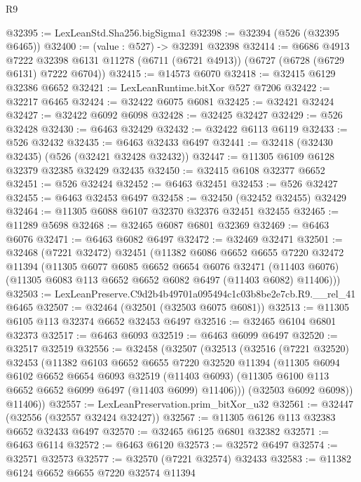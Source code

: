 \begin{lexlean}{R9}
\begin{coremodule}
@32395 := LexLeanStd.Sha256.bigSigma1
@32398 := @32394 (@526 (@32395 @6465))
@32400 := (value : @527) -> @32391 @32398
@32414 := @6686
    @4913
    @7222
    @32398
    @6131
    @11278
    (@6711 (@6721 @4913))
    (@6727 (@6728 (@6729 @6131) @7222 @6704))
@32415 := @14573 @6070
@32418 := @32415 @6129 @32386 @6652
@32421 := LexLeanRuntime.bitXor @527 @7206
@32422 := @32217 @6465
@32424 := @32422 @6075 @6081
@32425 := @32421 @32424
@32427 := @32422 @6092 @6098
@32428 := @32425 @32427
@32429 := @526 @32428
@32430 := @6463 @32429
@32432 := @32422 @6113 @6119
@32433 := @526 @32432
@32435 := @6463 @32433 @6497
@32441 := @32418 (@32430 @32435) (@526 (@32421 @32428 @32432))
@32447 := @11305 @6109 @6128 @32379 @32385 @32429 @32435
@32450 := @32415 @6108 @32377 @6652
@32451 := @526 @32424
@32452 := @6463 @32451
@32453 := @526 @32427
@32455 := @6463 @32453 @6497
@32458 := @32450 (@32452 @32455) @32429
@32464 := @11305 @6088 @6107 @32370 @32376 @32451 @32455
@32465 := @11289 @5698
@32468 := @32465 @6087 @6801 @32369
@32469 := @6463 @6076
@32471 := @6463 @6082 @6497
@32472 := @32469 @32471
@32501 := @32468
    (@7221 @32472)
    @32451
    (@11382
      @6086
      @6652
      @6655
      @7220
      @32472
      @11394
      (@11305
        @6077
        @6085
        @6652
        @6654
        @6076
        @32471
        (@11403 @6076)
        (@11305 @6083 @113 @6652 @6652 @6082 @6497 (@11403 @6082) @11406)))
@32503 := LexLeanPreserve.C9d2b4b49701a095494c1c03b8be2e7cb.R9.__rel_41 @6465
@32507 := @32464 (@32501 (@32503 @6075 @6081))
@32513 := @11305 @6105 @113 @32374 @6652 @32453 @6497
@32516 := @32465 @6104 @6801 @32373
@32517 := @6463 @6093
@32519 := @6463 @6099 @6497
@32520 := @32517 @32519
@32556 := @32458
    (@32507
      (@32513
        (@32516
          (@7221 @32520)
          @32453
          (@11382
            @6103
            @6652
            @6655
            @7220
            @32520
            @11394
            (@11305
              @6094
              @6102
              @6652
              @6654
              @6093
              @32519
              (@11403 @6093)
              (@11305 @6100 @113 @6652 @6652 @6099 @6497 (@11403 @6099) @11406)))
          (@32503 @6092 @6098))
        @11406))
@32557 := LexLeanPreservation.prim_bitXor_u32
@32561 := @32447 (@32556 (@32557 @32424 @32427))
@32567 := @11305 @6126 @113 @32383 @6652 @32433 @6497
@32570 := @32465 @6125 @6801 @32382
@32571 := @6463 @6114
@32572 := @6463 @6120
@32573 := @32572 @6497
@32574 := @32571 @32573
@32577 := @32570 (@7221 @32574) @32433
@32583 := @11382 @6124 @6652 @6655 @7220 @32574 @11394

\end{coremodule}
\end{lexlean}
